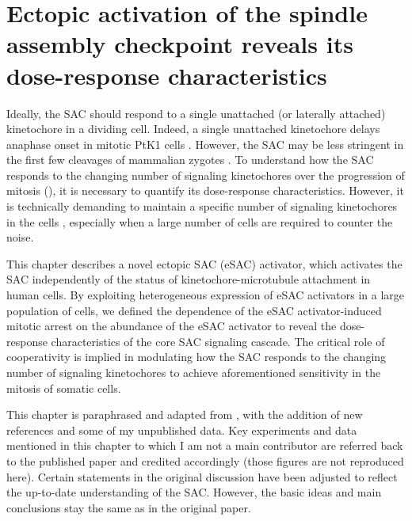\chapter{Ectopic activation of the spindle assembly checkpoint reveals its dose-response characteristics}
\label{chpt2}

Ideally, the SAC should respond to a single unattached (or laterally attached) kinetochore in a dividing cell. Indeed, a single unattached kinetochore delays anaphase onset in mitotic PtK1 cells \cite{PtK1SingleUnattachedKT}. However, the SAC may be less stringent in the first few cleavages of mammalian zygotes \cite{MouseEmbryoSAC, ParentalGenomeUnification}. To understand how the SAC responds to the changing number of signaling kinetochores over the progression of mitosis (), it is necessary to quantify its dose-response characteristics. However, it is technically demanding to maintain a specific number of signaling kinetochores in the cells \cite{Ablation}, especially when a large number of cells are required to counter the noise.

This chapter describes a novel ectopic SAC (eSAC) activator, which activates the SAC independently of the status of kinetochore-microtubule attachment in human cells. By exploiting heterogeneous expression of eSAC activators in a large population of cells, we defined the dependence of the eSAC activator-induced mitotic arrest on the abundance of the eSAC activator to reveal the dose-response characteristics of the core SAC signaling cascade. The critical role of cooperativity is implied in modulating how the SAC responds to the changing number of signaling kinetochores to achieve aforementioned sensitivity in the mitosis of somatic cells.

This chapter is paraphrased and adapted from \cite{eSAC}, with the addition of new references and some of my unpublished data. Key experiments and data mentioned in this chapter to which I am not a main contributor are referred back to the published paper and credited accordingly (those figures are not reproduced here). Certain statements in the original discussion have been adjusted to reflect the up-to-date understanding of the SAC. However, the basic ideas and main conclusions stay the same as in the original paper.

